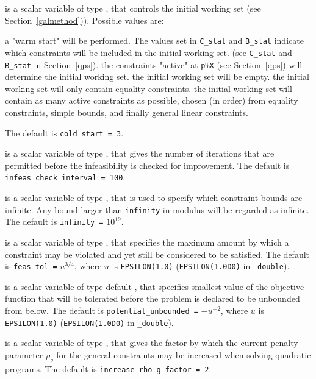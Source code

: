 \begin{description}
 is a scalar variable of type \integer, that controls
the initial working set (see Section~\ref{galmethod})). Possible values are:
\begin{description}
 a "warm start" will be performed. The values set in
     {\tt C\_stat} and {\tt B\_stat} indicate which
     constraints will be included in the initial working set.
     (see {\tt C\_stat} and {\tt B\_stat} in Section~\ref{qps}).
 the constraints "active" at {\tt p\%X} (see Section~\ref{qps})
     will determine the initial working set.
 the initial working set will be empty.
 the initial working set will only contain equality constraints.
 the initial working set will contain as many active constraints as
     possible, chosen (in order) from equality constraints, simple bounds, and
     finally general linear constraints.
\end{description}
The default is {\tt cold\_start = 3}.

 is a scalar variable of type \integer,
that gives the number of iterations that are permitted before the
infeasibility is checked for improvement.
The default is {\tt infeas\_check\_interval = 100}.

 is a scalar variable of type \realdp, that is used to
specify which constraint bounds are infinite.
Any bound larger than {\tt infinity} in modulus will be regarded as infinite.
The default is {\tt infinity =} $10^{19}$.

 is a scalar variable of type \realdp, that specifies the
maximum amount by which a constraint may be violated and yet still be
considered to be satisfied.
The default is {\tt feas\_tol =} $u^{3/4}$,
where $u$ is {\tt EPSILON(1.0)} ({\tt EPSILON(1.0D0)} in
{\tt \fullpackagename\_dou\-ble}).

  is a scalar variable of type default
\realdp, that specifies smallest
value of the objective function that will be tolerated before the problem
is declared to be unbounded from below.
The default is {\tt potential\_u\-nbounded =} $-u^{-2}$,
where $u$ is {\tt EPSILON(1.0)} ({\tt EPSILON(1.0D0)} in
{\tt \fullpackagename\_double}).

 is a scalar variable of type \realdp,
that gives the factor by which the current penalty parameter $\rho_g$
for the general constraints may be increased when solving quadratic programs.
The default is {\tt increase\_rho\_g\_factor = 2}.


\end{description}
